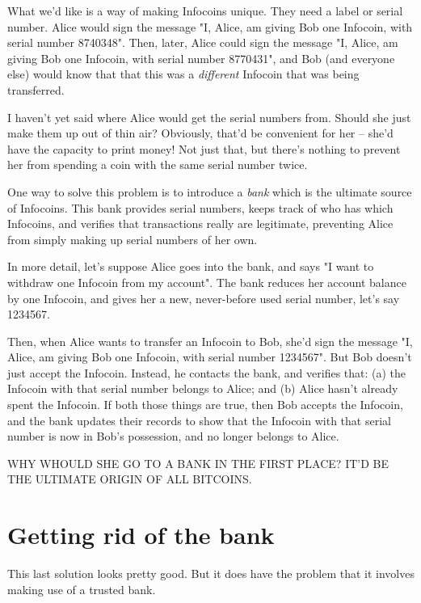\documentclass[12pt]{book}
\newcounter{problem}[chapter]
\begin{document}
What we'd like is a way of making Infocoins unique.  They need a label
or serial number.  Alice would sign the message "I, Alice, am giving
Bob one Infocoin, with serial number 8740348".  Then, later, Alice
could sign the message "I, Alice, am giving Bob one Infocoin, with
serial number 8770431", and Bob (and everyone else) would know that
that this was a \emph{different} Infocoin that was being transferred.

I haven't yet said where Alice would get the serial numbers from.
Should she just make them up out of thin air?  Obviously, that'd be
convenient for her -- she'd have the capacity to print money!  Not
just that, but there's nothing to prevent her from spending a coin
with the same serial number twice.

One way to solve this problem is to introduce a \emph{bank} which is
the ultimate source of Infocoins.  This bank provides serial numbers,
keeps track of who has which Infocoins, and verifies that transactions
really are legitimate, preventing Alice from simply making up serial
numbers of her own.

In more detail, let's suppose Alice goes into the bank, and says "I
want to withdraw one Infocoin from my account".  The bank reduces her
account balance by one Infocoin, and gives her a new, never-before
used serial number, let's say 1234567.

Then, when Alice wants to transfer an Infocoin to Bob, she'd sign the
message "I, Alice, am giving Bob one Infocoin, with serial number
1234567".  But Bob doesn't just accept the Infocoin.  Instead, he
contacts the bank, and verifies that: (a) the Infocoin with that
serial number belongs to Alice; and (b) Alice hasn't already spent the
Infocoin.  If both those things are true, then Bob accepts the
Infocoin, and the bank updates their records to show that the Infocoin
with that serial number is now in Bob's possession, and no longer
belongs to Alice.

WHY WHOULD SHE GO TO A BANK IN THE FIRST PLACE?  IT'D BE THE ULTIMATE
ORIGIN OF ALL BITCOINS.






\section{Getting rid of the bank}

This last solution looks pretty good.  But it does have the problem
that it involves making use of a trusted bank.
\end{document}

